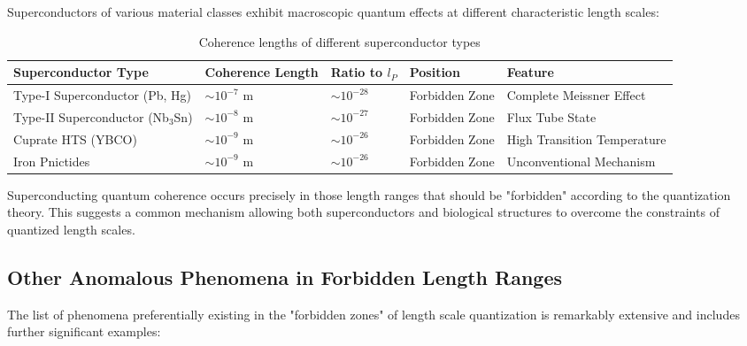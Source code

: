 \documentclass[12pt,a4paper]{article}
\begin{document}
	Superconductors of various material classes exhibit macroscopic quantum effects at different characteristic length scales:
	
	\begin{table}[h]
		\centering
		\begin{adjustbox}{scale=0.75}
			\begin{tabular}{lllll}
				\hline
				\textbf{Superconductor Type} & \textbf{Coherence Length} & \textbf{Ratio to $l_P$} & \textbf{Position} & \textbf{Feature} \\
				\hline
				Type-I Superconductor (Pb, Hg) & $\sim 10^{-7}$ m & $\sim 10^{-28}$ & Forbidden Zone & Complete Meissner Effect \\
				Type-II Superconductor (Nb$_3$Sn) & $\sim 10^{-8}$ m & $\sim 10^{-27}$ & Forbidden Zone & Flux Tube State \\
				Cuprate HTS (YBCO) & $\sim 10^{-9}$ m & $\sim 10^{-26}$ & Forbidden Zone & High Transition Temperature \\
				Iron Pnictides & $\sim 10^{-9}$ m & $\sim 10^{-26}$ & Forbidden Zone & Unconventional Mechanism \\
				\hline
			\end{tabular}
		\end{adjustbox}
		\caption{Coherence lengths of different superconductor types}
		\label{tab:supercond}
	\end{table}
	
	Superconducting quantum coherence occurs precisely in those length ranges that should be "forbidden" according to the quantization theory. This suggests a common mechanism allowing both superconductors and biological structures to overcome the constraints of quantized length scales.
	
	\subsection{Other Anomalous Phenomena in Forbidden Length Ranges}
	\label{subsec:weitere_anomale_phaenomene}
	
	The list of phenomena preferentially existing in the "forbidden zones" of length scale quantization is remarkably extensive and includes further significant examples:
	
\end{document}

